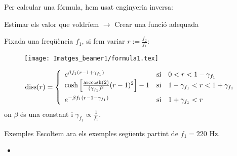 \documentclass[10pt,hyperref={colorlinks,linkcolor=black,citecolor=blue,urlcolor=blue!70},handout]{beamer}
\DeclareMathOperator{\diss}{diss}
\DeclareMathOperator{\arccosh}{arccosh}
\begin{document}
\begin{frame}
  Per calcular una fórmula, hem usat enginyeria inversa:\par
  \begin{center}
    Estimar els valor que voldríem $\longrightarrow$ Crear una funció adequada
  \end{center}\pause
  Fixada una freqüència $f_1$, si fem variar $r:=\frac{f_2}{f_1}$:\pause
  \begin{figure}
    \centering
    \texttt{[image: Imatges\_beamer1/formula1.tex]}
  \end{figure}\pause
  \scriptsize{$$\diss(r)=
      \left\{\begin{array}{lll}
        e^{\beta f_1(r-1+\gamma_{f_1})}                                 & \text{si} & 0<r<1-\gamma_{f_1}                          \\
        \cosh\left[\frac{\arccosh(2)}{(\gamma_{f_1})^2}(r-1)^2\right]-1 & \text{si} & 1-\gamma_{f_1}<r<1+\gamma_{f_1}\vspace{5pt} \\
        e^{-\beta f_1(r-1-\gamma_{f_1})}                                & \text{si} & 1+\gamma_{f_1}<r
      \end{array}\right.$$ on $\beta$ és una constant i $\gamma_{f_1}\propto\frac{1}{f_1}$.}
\end{frame}
\begin{frame}{Exemples}
  Escoltem ara els exemples següents partint de $f_1=220\text{ Hz}$.
  \begin{itemize}
    \item{}
  \end{itemize}
\end{frame}
\end{document}
